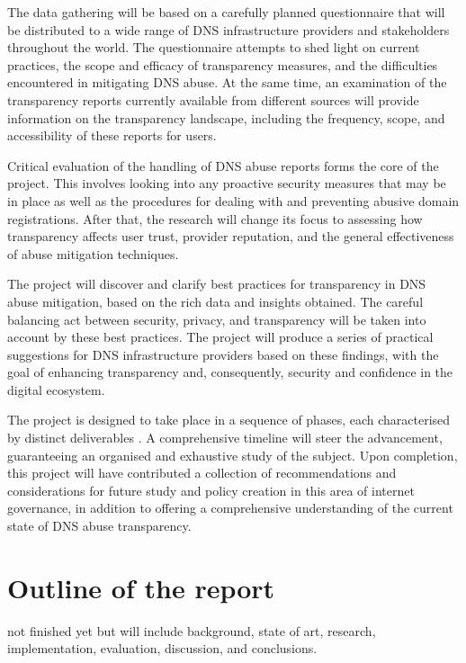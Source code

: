 The data gathering will be based on a carefully planned questionnaire that will be distributed to a wide range of DNS infrastructure providers and stakeholders throughout the world. The questionnaire attempts to shed light on current practices, the scope and efficacy of transparency measures, and the difficulties encountered in mitigating DNS abuse. At the same time, an examination of the transparency reports currently available from different sources will provide information on the transparency landscape, including the frequency, scope, and accessibility of these reports for users.

Critical evaluation of the handling of DNS abuse reports forms the core of the project. This involves looking into any proactive security measures that may be in place as well as the procedures for dealing with and preventing abusive domain registrations. After that, the research will change its focus to assessing how transparency affects user trust, provider reputation, and the general effectiveness of abuse mitigation techniques.

The project will discover and clarify best practices for transparency in DNS abuse mitigation, based on the rich data and insights obtained. The careful balancing act between security, privacy, and transparency will be taken into account by these best practices. The project will produce a series of practical suggestions for DNS infrastructure providers based on these findings, with the goal of enhancing transparency and, consequently, security and confidence in the digital ecosystem.

The project is designed to take place in a sequence of phases, each characterised by distinct deliverables . A comprehensive timeline will steer the advancement, guaranteeing an organised and exhaustive study of the subject. Upon completion, this project will have contributed a collection of recommendations and considerations for future study and policy creation in this  area of internet governance, in addition to offering a comprehensive understanding of the current state of DNS abuse transparency.

\section{Outline of the report}
not finished yet but will include background, state of art, research, implementation, evaluation, discussion, and conclusions. 
